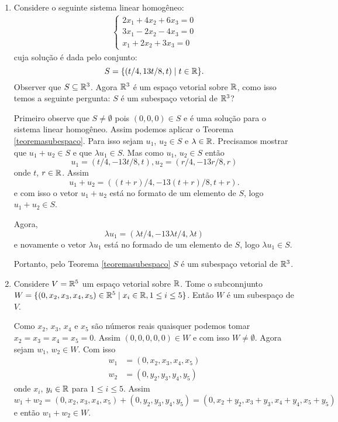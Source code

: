 \begin{exemplos}
	\begin{enumerate}[label={\arabic*})]
		\item Considere o seguinte sistema linear homogêneo:
			\begin{align}\label{exemplosistemahomogeneosubespaco}
				\begin{cases}
					2x_1 + 4x_2 + 6x_3 = 0\\
					3x_1 - 2x_2 - 4x_3 = 0\\
					x_1 + 2x_2 + 3x_3 = 0
				\end{cases}
			\end{align}
			cuja solução é dada pelo conjunto:
			\[
				S = \{(t/4,13t/8,t) \mid t \in \mathbb{R}\}.
			\]
			Observer que $S \subseteq \mathbb{R}^3$. Agora $\mathbb{R}^3$ é um espaço vetorial sobre $\mathbb{R}$, como isso temos a seguinte pergunta: $S$ é um subespaço vetorial de $\mathbb{R}^3$?
			\begin{solucao}
				Primeiro observe que $S \ne \emptyset$ pois $(0,0,0) \in S$ e é uma solução para o sistema linear homogêneo. Assim podemos aplicar o Teorema \ref{teoremasubespaco}. Para isso sejam $u_1$, $u_2 \in S$ e $\lambda \in \mathbb{R}$.
				Precisamos mostrar que $u_1 + u_2 \in S$ e que $\lambda u_1 \in S$. Mas como $u_1$, $u_2 \in S$ então
				\[
					u_1 = (t/4, -13t/8, t),
					u_2 = (r/4, -13r/8,r)
				\]
				onde $t$, $r \in \mathbb{R}$. Assim
				\[
					u_1 + u_2 = ((t + r)/4, -13(t + r)/8, t + r).
				\]
				e com isso o vetor $u_1 + u_2$ está no formato de um elemento de $S$, logo $u_1 + u_2 \in S$.

                Agora,
                \[
                    \lambda u_1 = (\lambda t/4, -13\lambda t/4, \lambda t)
                \]
			    e novamente o vetor $\lambda u_1$ está no formado de um elemento de $S$, logo $\lambda u_1 \in S$.

                Portanto, pelo Teorema \ref{teoremasubespaco} $S$ é um subespaço vetorial de $\mathbb{R}^3$.
		  \end{solucao}
	\item Considere $V = \mathbb{R}^5$ um espaço vetorial sobre $\mathbb{R}$. Tome o subconnjunto $W = \{(0,x_2,x_3,x_4,x_5) \in \mathbb{R}^5 \mid x_i \in \mathbb{R}, 1 \le i \le 5\}$. Então $W$ \'e um subespa\c{c}o de $V$.
		\begin{solucao}
			Como $x_2$, $x_3$, $x_4$ e $x_5$ são números reais quaisquer podemos tomar $x_2 = x_3 = x_4 = x_ 5 = 0$. Assim $(0, 0, 0, 0, 0) \in W$ e com isso $W \ne \emptyset$. Agora sejam $w_1$, $w_2 \in W$. Com isso
			\begin{align*}
				w_1 &= (0,x_2, x_3, x_4, x_5)\\
				w_2 &= (0,y_2, y_3, y_4, y_5)
			\end{align*}
			onde $x_i$, $y_i \in \mathbb{R}$ para $1 \le i \le 5$. Assim
			\[
				w_1 + w_2 = (0,x_2, x_3, x_4, x_5) + (0,y_2, y_3, y_4, y_5) = (0, x_2 + y_2, x_3 + y_3, x_4 + y_4, x_5 + y_5)
			\]
			e então $w_1 + w_2 \in W$.


\end{solucao}
\end{enumerate}
\end{exemplos}
